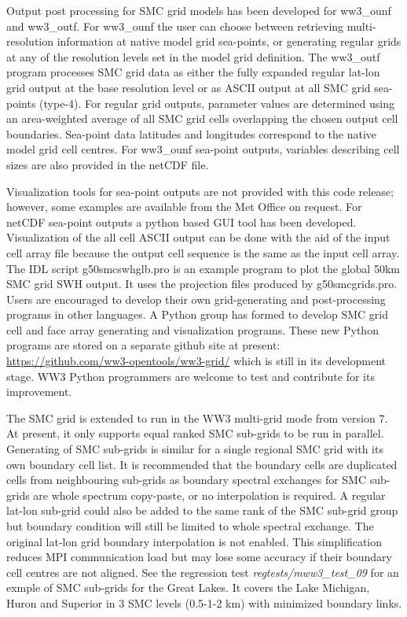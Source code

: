 Output post processing for SMC grid models has been developed for
ww3\_ounf and ww3\_outf. For ww3\_ounf the user can choose between
retrieving multi-resolution information at native model grid sea-points,
or generating regular grids at any of the resolution levels set in
the model grid definition. The ww3\_outf program processes SMC grid data
as either the fully expanded regular lat-lon grid output at the base
resolution level or as ASCII output at all SMC grid sea-points (type-4).
For regular grid outputs, parameter values are determined
using an area-weighted average of all SMC grid cells overlapping the chosen
output cell boundaries. Sea-point data latitudes and longitudes 
correspond to the native model grid cell centres. For ww3\_ounf
sea-point outputs, variables describing cell sizes are also provided
in the netCDF file.

Visualization tools for sea-point outputs are not provided with this
code release; however, some examples are available from the Met Office
on request. For netCDF sea-point outputs a python based GUI tool has
been developed. Visualization of the all cell ASCII output can be done
with the aid of the input cell array file because the output cell 
sequence is the same as the input cell array. The IDL script 
g50smcswhglb.pro is an example program to plot the global 50km SMC grid
SWH output. It uses the projection files produced by g50smcgrids.pro. 
Users are encouraged to develop their own grid-generating and 
post-processing programs in other languages.  A Python group has formed to
develop SMC grid cell and face array generating and visualization programs.
These new Python programs are stored on a separate github site at present:  
\url{https://github.com/ww3-opentools/ww3-grid/}
which is still in its development stage.  WW3 Python programmers are welcome to
test and contribute for its improvement.  

The SMC grid is extended to run in the WW3 multi-grid mode from version 7.  At 
present, it only supports equal ranked SMC sub-grids to be run in parallel.
Generating of SMC sub-grids is similar for a single regional SMC grid with its
own boundary cell list.  It is recommended that the boundary cells are
duplicated cells from neighbouring sub-grids as boundary spectral exchanges for
SMC sub-grids are whole spectrum copy-paste, or no interpolation is required.
A regular lat-lon sub-grid could also be added to the same rank of the SMC 
sub-grid group but boundary condition will still be limited to whole spectral
exchange.  The original lat-lon grid boundary interpolation is not enabled. 
This simplification reduces MPI communication load but may lose some accuracy
if their boundary cell centres are not aligned.  See the regression test    
\emph{regtests/mww3\_test\_09} for an exmple of SMC sub-grids for the Great
Lakes.  It covers the Lake Michigan, Huron and Superior in 3 SMC levels 
(0.5-1-2 km) with minimized boundary links.
  
